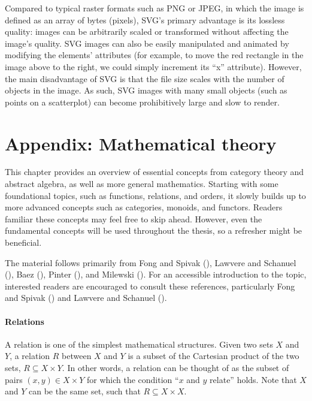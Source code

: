\documentclass[
  openany]{book}
\theoremstyle{definition}
\theoremstyle{definition}
\theoremstyle{definition}
\theoremstyle{definition}
\theoremstyle{remark}
\begin{document}
Compared to typical raster formats such as PNG or JPEG, in which the image is defined as an array of bytes (pixels), SVG's primary advantage is its lossless quality: images can be arbitrarily scaled or transformed without affecting the image's quality. SVG images can also be easily manipulated and animated by modifying the elements' attributes (for example, to move the red rectangle in the image above to the right, we could simply increment its ``x'' attribute). However, the main disadvantage of SVG is that the file size scales with the number of objects in the image. As such, SVG images with many small objects (such as points on a scatterplot) can become prohibitively large and slow to render.

\newcommand\thenb{;}

\chapter{Appendix: Mathematical theory}\label{math}

This chapter provides an overview of essential concepts from category theory and abstract algebra, as well as more general mathematics. Starting with some foundational topics, such as functions, relations, and orders, it slowly builds up to more advanced concepts such as categories, monoids, and functors. Readers familiar these concepts may feel free to skip ahead. However, even the fundamental concepts will be used throughout the thesis, so a refresher might be beneficial.

The material follows primarily from Fong and Spivak (), Lawvere and Schanuel (), Baez (), Pinter (), and Milewski (). For an accessible introduction to the topic, interested readers are encouraged to consult these references, particularly Fong and Spivak () and Lawvere and Schanuel ().

\subsubsection{Relations}\label{relations}

A relation is one of the simplest mathematical structures. Given two sets \(X\) and \(Y\), a relation \(R\) between \(X\) and \(Y\) is a subset of the Cartesian product of the two sets, \(R \subseteq X \times Y\). In other words, a relation can be thought of as the subset of pairs \((x, y) \in X \times Y\) for which the condition ``\(x\) and \(y\) relate'' holds. Note that \(X\) and \(Y\) can be the same set, such that \(R \subseteq X \times X\).
\end{document}
